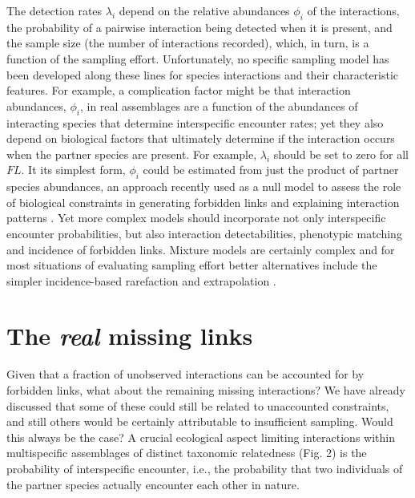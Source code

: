 \documentclass[12pt]{article}
\begin{document}
The detection rates $\lambda_i$ depend on the relative abundances $\phi_i$ of the interactions, the probability of a pairwise interaction being detected when it is present, and the sample size (the number of interactions recorded), which, in turn, is a function of the sampling effort. Unfortunately, no specific sampling model has been developed along these lines for species interactions and their characteristic features. For example, a complication factor might be that interaction abundances, $\phi_i$, in real assemblages are a function of the abundances of interacting species that determine interspecific encounter rates; yet they also depend on biological factors that ultimately determine if the interaction occurs when the partner species are present. For example, $\lambda_i$ should be set to zero for all $FL$. It its simplest form, $\phi_i$ could be estimated from just the product of partner species abundances, an approach recently used as a null model to assess the role of biological constraints in generating forbidden links and explaining interaction patterns \citep{Vizentin-Bugoni:2014hc}. Yet more complex models \citeyearpar[e.g., Wells \& O'hara ][]{Wells:2012dy} should incorporate not only interspecific encounter probabilities, but also interaction detectabilities, phenotypic matching and incidence of forbidden links. Mixture models are certainly complex and for most situations of evaluating sampling effort better alternatives include the simpler incidence-based rarefaction and extrapolation \citep{Colwell:2012fc,Chao:2014wm}.  

\section*{The \emph{real} missing links}
\label{therealmissinglinks}

Given that a fraction of unobserved interactions can be accounted for by forbidden links, what about the remaining missing interactions? We have already discussed that some of these could still be related to unaccounted constraints, and still others would be certainly attributable to insufficient sampling. Would this always be the case? A crucial ecological aspect limiting interactions within multispecific assemblages of distinct taxonomic relatedness (Fig. 2) is the probability of interspecific encounter, i.e., the probability that two individuals of the partner species actually encounter each other in nature. 
\end{document}
